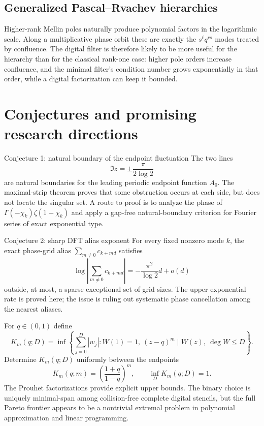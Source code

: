 \documentclass[11pt]{article}
\numberwithin{equation}{section}
\theoremstyle{definition}
\theoremstyle{remark}
\begin{document}
\subsection{Generalized Pascal--Rvachev hierarchies}

Higher-rank Mellin poles naturally produce polynomial factors in the logarithmic scale.
Along a multiplicative phase orbit these are exactly the $s^\ell q^{rs}$ modes treated by
confluence.  The digital filter is therefore likely to be more useful for the hierarchy
than for the classical rank-one case: higher pole orders increase confluence, and the
minimal filter's condition number grows exponentially in that order, while a digital
factorization can keep it bounded.

\section{Conjectures and promising research directions}
\label{p6:sec:open}

\begin{conjecturebox}{Conjecture 1: natural boundary of the endpoint fluctuation}
The two lines
\[
 \Im z=\pm\frac{\pi}{2\log2}
\]
are natural boundaries for the leading periodic endpoint function $A_0$.  The maximal-strip
theorem proves that some obstruction occurs at each side, but does not locate the singular
set.  A route to proof is to analyze the phase of
$\Gamma(-\chi_k)\zeta(1-\chi_k)$ and apply a gap-free natural-boundary criterion for Fourier
series of exact exponential type.
\end{conjecturebox}

\begin{conjecturebox}{Conjecture 2: sharp DFT alias exponent}
For every fixed nonzero mode $k$, the exact phase-grid alias
$\sum_{m\ne0}c_{k+md}$ satisfies
\[
 \log\left|\sum_{m\ne0}c_{k+md}\right|
 =-\frac{\pi^2}{\log2}d+o(d)
\]
outside, at most, a sparse exceptional set of grid sizes.  The upper exponential rate is
proved here; the issue is ruling out systematic phase cancellation among the nearest aliases.
\end{conjecturebox}

\begin{problem}
For $q\in(0,1)$ define
\[
 K_m(q;D)=\inf\left\{\sum_{j=0}^{D}|w_j|:
 W(1)=1,\ (z-q)^m\mid W(z),\ \deg W\le D\right\}.
\]
Determine $K_m(q;D)$ uniformly between the endpoints
\[
 K_m(q;m)=\left(\frac{1+q}{1-q}\right)^m,
 \qquad
 \inf_DK_m(q;D)=1.
\]
The Prouhet factorizations provide explicit upper bounds.  The binary choice is uniquely
minimal-span among collision-free complete digital stencils, but the full Pareto frontier
appears to be a nontrivial extremal problem in polynomial approximation and linear
programming.
\end{problem}
\end{document}
